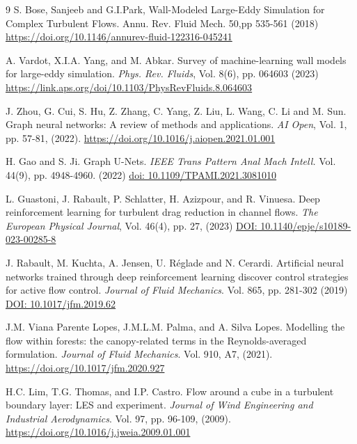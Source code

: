 \documentclass{article}
\begin{document}
\begin{thebibliography}{9}
 S. Bose, Sanjeeb and G.I.Park, Wall-Modeled Large-Eddy Simulation for Complex Turbulent Flows. Annu. Rev. Fluid Mech. 50,pp 535-561 (2018) \href{https://doi.org/10.1146/annurev-fluid-122316-045241}{https://doi.org/10.1146/annurev-fluid-122316-045241}

 A. Vardot, X.I.A. Yang, and M. Abkar. Survey of machine-learning wall models for large-eddy simulation. {\it Phys. Rev. Fluids}, Vol. 8(6), pp. 064603 (2023) \href{https://link.aps.org/doi/10.1103/PhysRevFluids.8.064603} {https://link.aps.org/doi/10.1103/PhysRevFluids.8.064603}

 J. Zhou, G. Cui, S. Hu, Z. Zhang, C. Yang, Z. Liu, L. Wang, C. Li and M. Sun.
Graph neural networks: A review of methods and applications. {\it AI Open}, Vol. 1, pp. 57-81, (2022). \href{https://doi.org/10.1016/j.aiopen.2021.01.001}{https://doi.org/10.1016/j.aiopen.2021.01.001}

 H. Gao and S. Ji. Graph U-Nets. {\it IEEE Trans Pattern Anal Mach Intell.} Vol. 44(9), pp. 4948-4960. (2022) \href{https://ieeexplore.ieee.org/document/9432709}{doi: 10.1109/TPAMI.2021.3081010}

 L. Guastoni, J. Rabault, P. Schlatter, H. Azizpour, and R. Vinuesa. Deep reinforcement learning for turbulent drag reduction in channel flows. {\it The European Physical Journal}, Vol. 46(4), pp. 27, (2023) \href{https://pubmed.ncbi.nlm.nih.gov/37039923/}{DOI: 10.1140/epje/s10189-023-00285-8}

 J. Rabault, M. Kuchta, A. Jensen, U. Réglade and N. Cerardi. Artificial neural networks trained through deep reinforcement learning discover control strategies for active flow control. {\it Journal of Fluid Mechanics}. Vol. 865, pp. 281-302 (2019) \href{https://www.cambridge.org/core/journals/journal-of-fluid-mechanics/article/abs/artificial-neural-networks-trained-through-deep-reinforcement-learning-discover-control-strategies-for-active-flow-control/D5B80D809DFFD73760989A07F5E11039}{DOI: 10.1017/jfm.2019.62}

 J.M. Viana Parente Lopes, J.M.L.M. Palma, and A. Silva Lopes. Modelling the flow within forests: the canopy-related terms in the Reynolds-averaged formulation. {\it Journal of Fluid Mechanics}. Vol. 910, A7, (2021). \href{https://doi.org/10.1017/jfm.2020.927}{https://doi.org/10.1017/jfm.2020.927}

 H.C. Lim, T.G. Thomas, and I.P. Castro. Flow around a cube in a turbulent boundary layer: LES and experiment. {\it Journal of Wind Engineering and Industrial Aerodynamics}. Vol. 97, pp. 96-109, (2009). \href{https://doi.org/10.1016/j.jweia.2009.01.001}{https://doi.org/10.1016/j.jweia.2009.01.001}


\end{thebibliography}
\end{document}
